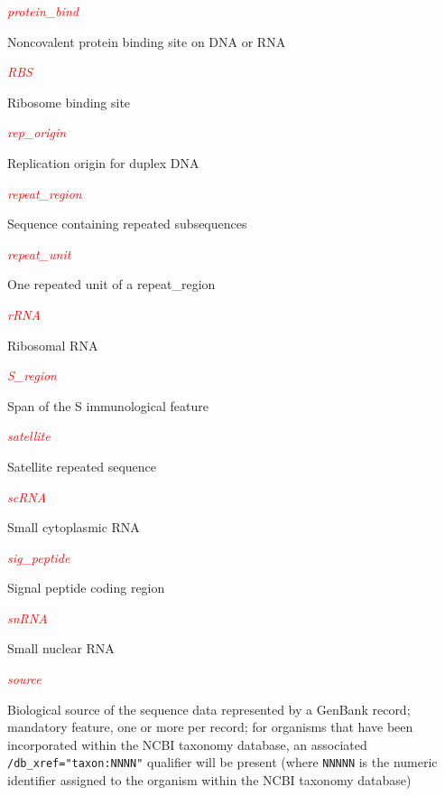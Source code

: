\textcolor{red}{\textit{protein\_bind}}
\begin{adjustwidth}{2em}{}
Noncovalent protein binding site on DNA or RNA
\end{adjustwidth}

\textcolor{red}{\textit{RBS}}
\begin{adjustwidth}{2em}{}
Ribosome binding site
\end{adjustwidth}

\textcolor{red}{\textit{rep\_origin}}
\begin{adjustwidth}{2em}{}
Replication origin for duplex DNA
\end{adjustwidth}

\textcolor{red}{\textit{repeat\_region}}
\begin{adjustwidth}{2em}{}
Sequence containing repeated subsequences
\end{adjustwidth}

\textcolor{red}{\textit{repeat\_unit}}
\begin{adjustwidth}{2em}{}
One repeated unit of a repeat\_region
\end{adjustwidth}

\textcolor{red}{\textit{rRNA}}
\begin{adjustwidth}{2em}{}
Ribosomal RNA
\end{adjustwidth}

\textcolor{red}{\textit{S\_region}}
\begin{adjustwidth}{2em}{}
Span of the S immunological feature
\end{adjustwidth}

\textcolor{red}{\textit{satellite}}
\begin{adjustwidth}{2em}{}
Satellite repeated sequence
\end{adjustwidth}

\textcolor{red}{\textit{scRNA}}
\begin{adjustwidth}{2em}{}
Small cytoplasmic RNA
\end{adjustwidth}

\textcolor{red}{\textit{sig\_peptide}}
\begin{adjustwidth}{2em}{}
Signal peptide coding region
\end{adjustwidth}

\textcolor{red}{\textit{snRNA}}
\begin{adjustwidth}{2em}{}
Small nuclear RNA
\end{adjustwidth}

\textcolor{red}{\textit{source}}
\begin{adjustwidth}{2em}{}
Biological source of the sequence data represented by a GenBank record; mandatory feature, one or more per record; for organisms that have been incorporated within the NCBI taxonomy database, an associated \verb|/db_xref="taxon:NNNN"| qualifier will be present (where \verb|NNNNN| is the numeric identifier assigned to the organism within the NCBI taxonomy database)
\end{adjustwidth}

